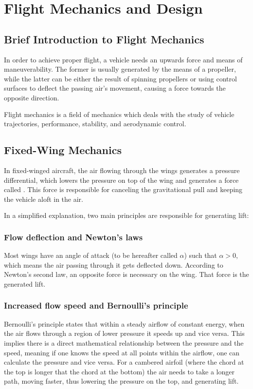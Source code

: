 
\chapter{Flight Mechanics and Design} \label{chap:FlightMechanics}

\section{Brief Introduction to Flight Mechanics}

In order to achieve proper flight, a vehicle needs an upwards force and means of maneuverability. The former is usually generated by the means of a propeller, while the latter can be either the result of spinning propellers or using control surfaces to deflect the passing air's movement, causing a force towards the opposite direction. 


Flight mechanics is a field of mechanics which deals with the study of vehicle trajectories, performance, stability, and aerodynamic
control.


\section{Fixed-Wing Mechanics}

In fixed-winged aircraft, the air flowing through the wings generates a pressure differential, which lowers the pressure on top of the wing and generates a force called . This force is responsible for canceling the gravitational pull and keeping the vehicle aloft in the air.

In a simplified explanation, two main principles are responsible for generating lift:

\subsection{Flow deflection and Newton's laws}

Most wings have an angle of attack (to be hereafter called $\alpha$) such that $\alpha > 0$, which means the air passing through it gets deflected down. According to Newton's second law, an opposite force is necessary on the wing. That force is the generated lift.

\subsection{Increased flow speed and Bernoulli's principle}

Bernoulli's principle states that within a steady airflow of constant energy, when the air flows through a region of lower pressure it speeds up and vice versa. This implies there is a direct mathematical relationship between the pressure and the speed, meaning if one knows the speed at all points within the airflow, one can calculate the pressure and vice versa. For a cambered airfoil (where the chord at the top is longer that the chord at the bottom) the air needs to take a longer path, moving faster, thus lowering the pressure on the top, and generating lift.


